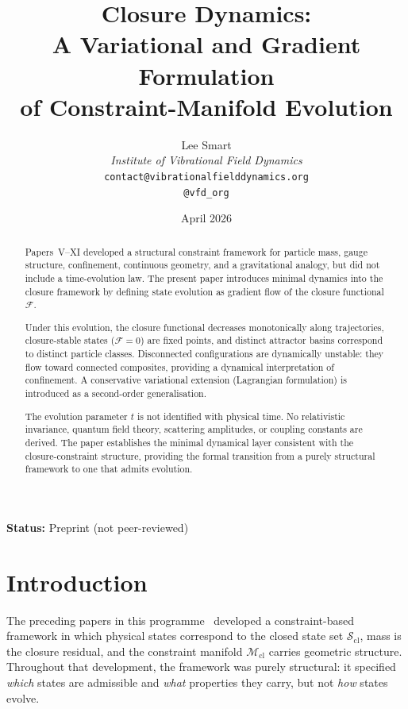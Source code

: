 \documentclass[12pt]{article}
\title{Closure Dynamics:\\A Variational and Gradient Formulation\\of Constraint-Manifold Evolution}
\author{%
  Lee Smart\\[4pt]
  \textit{Institute of Vibrational Field Dynamics}\\[2pt]
  \texttt{contact@vibrationalfielddynamics.org}\\[2pt]
  \texttt{@vfd\_org}%
}
\date{April 2026}
\newcommand{\Mcl}{\mathcal{M}_{\mathrm{cl}}}
\newcommand{\Fcal}{\mathcal{F}}
\newcommand{\Scl}{\mathcal{S}_{\mathrm{cl}}}
\begin{document}
\maketitle

\noindent\textbf{Status:} Preprint (not peer-reviewed)

\begin{abstract}
Papers~V--XI developed a structural constraint framework for particle mass, gauge structure, confinement, continuous geometry, and a gravitational analogy, but did not include a time-evolution law. The present paper introduces minimal dynamics into the closure framework by defining state evolution as gradient flow of the closure functional $\Fcal$.

Under this evolution, the closure functional decreases monotonically along trajectories, closure-stable states ($\Fcal = 0$) are fixed points, and distinct attractor basins correspond to distinct particle classes. Disconnected configurations are dynamically unstable: they flow toward connected composites, providing a dynamical interpretation of confinement. A conservative variational extension (Lagrangian formulation) is introduced as a second-order generalisation.

The evolution parameter $t$ is not identified with physical time. No relativistic invariance, quantum field theory, scattering amplitudes, or coupling constants are derived. The paper establishes the minimal dynamical layer consistent with the closure-constraint structure, providing the formal transition from a purely structural framework to one that admits evolution.
\end{abstract}

\section{Introduction}\label{sec:intro}

The preceding papers in this programme~\citep{SmartV, SmartVII, SmartVIII, SmartIX, SmartX, SmartXI} developed a constraint-based framework in which physical states correspond to the closed state set $\Scl$, mass is the closure residual, and the constraint manifold $\Mcl$ carries geometric structure. Throughout that development, the framework was purely structural: it specified \textit{which} states are admissible and \textit{what} properties they carry, but not \textit{how} states evolve.
\end{document}
